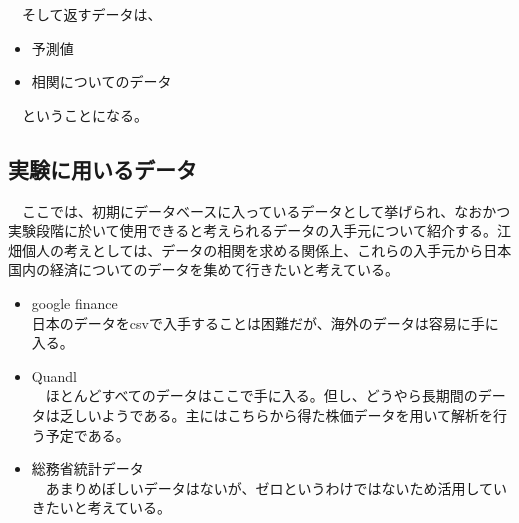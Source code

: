\documentclass{scrartcl}
\begin{document}
\begin{table}[htbp]
　そして返すデータは、\\
\begin{itemize}
\item 予測値\\
\item 相関についてのデータ\\
\end{itemize}

　ということになる。\\

\subsection{実験に用いるデータ}
\label{sec:orgcfaae24}
　ここでは、初期にデータベースに入っているデータとして挙げられ、なおかつ実験段階に於いて使用できると考えられるデータの入手元について紹介する。江畑個人の考えとしては、データの相関を求める関係上、これらの入手元から日本国内の経済についてのデータを集めて行きたいと考えている。\\
\begin{itemize}
\item google finance\\
日本のデータをcsvで入手することは困難だが、海外のデータは容易に手に入る。\\
\item Quandl\\
　ほとんどすべてのデータはここで手に入る。但し、どうやら長期間のデータは乏しいようである。主にはこちらから得た株価データを用いて解析を行う予定である。\\
\item 総務省統計データ\\
　あまりめぼしいデータはないが、ゼロというわけではないため活用していきたいと考えている。\\
\end{itemize}


\end{table}
\end{document}
